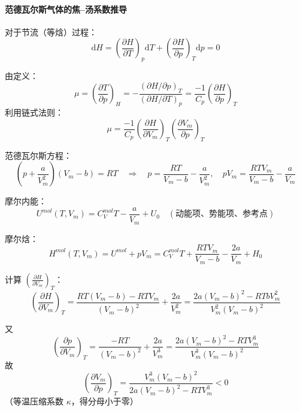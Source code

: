 \documentclass[UTF8]{ctexart}
\theoremstyle{definition}
\begin{document}
\paragraph{范德瓦尔斯气体的焦--汤系数推导}

对于节流（等焓）过程：
\begin{equation}
\mathrm{d}H = \left(\frac{\partial H}{\partial T}\right)_p\mathrm{d}T + \left(\frac{\partial H}{\partial p}\right)_T\mathrm{d}p = 0
\end{equation}

由定义：
\begin{equation}
\mu = \left(\frac{\partial T}{\partial p}\right)_H = -\frac{(\partial H/\partial p)_T}{(\partial H/\partial T)_p} = \frac{-1}{C_p}\left(\frac{\partial H}{\partial p}\right)_T
\end{equation}
利用链式法则：
\begin{equation}
\mu = \frac{-1}{C_p}\left(\frac{\partial H}{\partial V_m}\right)_T\left(\frac{\partial V_m}{\partial p}\right)_T
\end{equation}

范德瓦尔斯方程：
\begin{equation}
\left(p+\frac{a}{V_m^2}\right)(V_m-b) = RT \quad\Rightarrow\quad p = \frac{RT}{V_m-b} - \frac{a}{V_m^2},\quad pV_m = \frac{RTV_m}{V_m-b} - \frac{a}{V_m}
\end{equation}

摩尔内能：
\begin{equation}
U^{mol}(T,V_m) = C_V^{mol}T - \frac{a}{V_m} + U_0 \quad (\text{动能项、势能项、参考点})
\end{equation}

摩尔焓：
\begin{equation}
H^{mol}(T,V_m) = U^{mol} + pV_m = C_V^{mol}T + \frac{RTV_m}{V_m-b} - \frac{2a}{V_m} + H_0
\end{equation}

计算 $\displaystyle\left(\frac{\partial H}{\partial V_m}\right)_T$：
\begin{equation}
\left(\frac{\partial H}{\partial V_m}\right)_T = \frac{RT(V_m-b)-RTV_m}{(V_m-b)^2} + \frac{2a}{V_m^2} = \frac{2a(V_m-b)^2-RTbV_m^2}{V_m^2(V_m-b)^2}
\end{equation}

又
\begin{equation}
\left(\frac{\partial p}{\partial V_m}\right)_T = \frac{-RT}{(V_m-b)^2} + \frac{2a}{V_m^3} = \frac{2a(V_m-b)^2-RTV_m^3}{V_m^3(V_m-b)^2}
\end{equation}
故
\begin{equation}
\left(\frac{\partial V_m}{\partial p}\right)_T = \frac{V_m^3(V_m-b)^2}{2a(V_m-b)^2-RTV_m^3} < 0
\end{equation}
（等温压缩系数 $\kappa$，得分母小于零）
\end{document}
